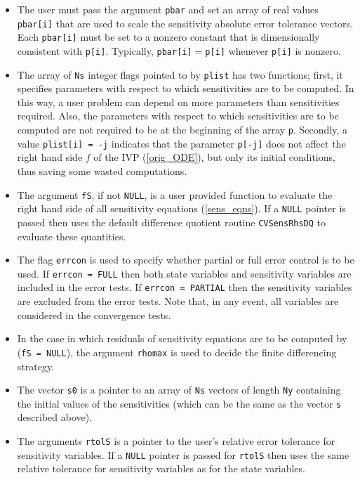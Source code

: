 \begin{itemize}
\begin{itemize}
\item The user must pass the argument {\tt pbar} and
  set an array of real values {\tt pbar[i]} that are used to scale the
  sensitivity absolute error tolerance vectors.
  Each {\tt pbar[i]} must be set to a nonzero constant that is
  dimensionally consistent with {\tt p[i]}.
  Typically, {\tt pbar[i]}$=${\tt p[i]} whenever {\tt p[i]} is nonzero.

\item The array of {\tt Ns} integer flags pointed to by {\tt plist} has 
  two functions; first, it specifies parameters with respect to which 
  sensitivities  are to be computed. In this way, a user problem can
  depend on more parameters than sensitivities required. Also, the parameters
  with respect to which sensitivities are to be computed are not required
  to be at the beginning of the array {\tt p}. Secondly, a value 
  {\tt plist[i] = -j} indicates that the parameter {\tt p[-j]} does not
  affect the right hand side $f$ of the IVP (\ref{orig_ODE}), but only its
  initial conditions, thus saving some wasted computations.

\item The argument {\tt fS}, if not {\tt NULL}, is a user provided {\C} function
  to evaluate the right hand side of all sensitivity equations
  (\ref{sens_eqns}). If a {\tt NULL} pointer is passed then {\codeS}
  uses the default difference quotient routine {\tt CVSensRhsDQ}
  to evaluate these quantities. 

\item The flag {\tt errcon} is used to specify whether partial or full error 
  control is to be used. If {\tt errcon = FULL} then both state variables and
  sensitivity variables are included in the error tests. If {\tt errcon = PARTIAL}
  then the sensitivity variables are excluded from the error tests. Note that,
  in any event, all variables are considered in the convergence tests.

\item In the case in which residuals of sensitivity equations are to be 
  computed by {\codeS} ({\tt fS = NULL}), the argument {\tt rhomax} is 
  used to decide the finite differencing strategy. 

\item The vector {\tt s0} is a pointer to an array of {\tt Ns} vectors of 
  length {\tt Ny} containing the initial values of
  the sensitivities (which can be the same as the vector {\tt s} described above).

\item The arguments {\tt rtolS} is a pointer to the user's 
  relative error tolerance for sensitivity variables.
  If a {\tt NULL} pointer is passed for {\tt rtolS} then {\codeS} uses the same
  relative tolerance for sensitivity variables as for the state variables.


\end{itemize}
\end{itemize}
